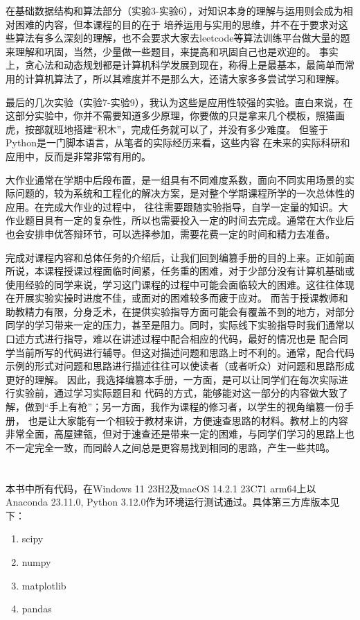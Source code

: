 \documentclass[UTF8,a5paper,10pt]{ctexbook}
\makeatletter
\renewcommand\tableofcontents{%
    \thispagestyle{empty}
    \section*{\contentsname
        \@mkboth{%
           \MakeUppercase\contentsname}{\MakeUppercase\contentsname}}%
    \@starttoc{toc}%
    \newpage
    }
\makeatother
\begin{document}
在基础数据结构和算法部分（实验3-实验6），对知识本身的理解与运用则会成为相对困难的内容，但本课程的目的在于
培养运用与实用的思维，并不在于要求对这些算法有多么深刻的理解，也不会要求大家去leetcode等算法训练平台做大量的题来理解和巩固，当然，少量做一些题目，来提高和巩固自己也是欢迎的。
事实上，贪心法和动态规划都是计算机科学发展到现在，称得上是最基本，最简单而常用的计算机算法了，所以其难度并不是那么大，还请大家多多尝试学习和理解。

最后的几次实验（实验7-实验9），我认为这些是应用性较强的实验。直白来说，在这部分实验中，你并不需要知道多少原理，你要做的只是拿来几个模板，照猫画虎，按部就班地搭建“积木”，完成任务就可以了，并没有多少难度。
但鉴于Python是一门脚本语言，从笔者的实际经历来看，这些内容
在未来的实际科研和应用中，反而是非常非常有用的。

大作业通常在学期中后段布置，是一组具有不同难度系数，面向不同实用场景的实际问题的，较为系统和工程化的解决方案，是对整个学期课程所学的一次总体性的应用。在完成大作业的过程中，
往往需要跟随实验指导，自学一定量的知识。大作业题目具有一定的复杂性，所以也需要投入一定的时间去完成。通常在大作业后也会安排申优答辩环节，可以选择参加，需要花费一定的时间和精力去准备。

完成对课程内容和总体任务的介绍后，让我们回到编篡手册的目的上来。正如前面所说，本课程授课过程面临时间紧，任务重的困难，对于少部分没有计算机基础或使用经验的同学来说，学习这门课程的过程中可能会面临较大的困难。这往往体现在开展实验实操时进度不佳，或面对的困难较多而疲于应对。
而苦于授课教师和助教精力有限，分身乏术，在提供实验指导方面可能会有覆盖不到的地方，对部分同学的学习带来一定的压力，甚至是阻力。同时，实际线下实验指导时我们通常以口述方式进行指导，难以在讲述过程中配合相应的代码，最好的情况也是
配合同学当前所写的代码进行辅导。但这对描述问题和思路上时不利的。通常，配合代码示例的形式对问题和思路进行描述往往可以使读者（或者听众）对问题和思路形成更好的理解。
因此，我选择编篡本手册，一方面，是可以让同学们在每次实际进行实验前，通过学习实际题目和
代码的方式，能够能对这一部分的内容做大致了解，做到“手上有枪”；另一方面，我作为课程的修习者，以学生的视角编篡一份手册，
也是让大家能有一个相较于教材来讲，方便速查思路的材料。教材上的内容非常全面，高屋建瓴，但对于速查还是带来一定的困难，与同学们学习的思路上也不一定完全一致，而同龄人之间总是更容易找到相同的思路，产生一些共鸣。
\newpage
\tableofcontents
\thispagestyle{empty}
本书中所有代码，在Windows 11 23H2及macOS 14.2.1 23C71 arm64上以Anaconda 23.11.0, Python 3.12.0作为环境运行测试通过。具体第三方库版本见下：
\begin{enumerate}
    \item scipy
    \item numpy
    \item matplotlib
    \item pandas
\end{enumerate}
\newpage
{}

\end{document}

